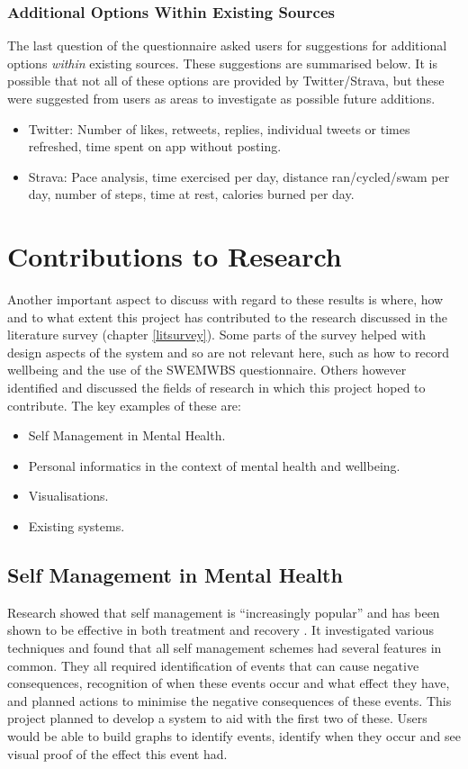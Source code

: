 \documentclass[11pt,openright,a4paper]{report}
\begin{document}
\subsubsection{Additional Options Within Existing Sources}
The last question of the questionnaire asked users for suggestions for additional options \emph{within} existing sources. These suggestions are summarised below. It is possible that not all of these options are provided by Twitter/Strava, but these were suggested from users as areas to investigate as possible future additions.
\begin{itemize}
\item Twitter: Number of likes, retweets, replies, individual tweets or times refreshed, time spent on app without posting.
\item Strava: Pace analysis, time exercised per day, distance ran/cycled/swam per day, number of steps, time at rest, calories burned per day.
\end{itemize}

\section{Contributions to Research} \label{sec:contr}
Another important aspect to discuss with regard to these results is where, how and to what extent this project has contributed to the research discussed in the literature survey (chapter \ref{litsurvey}). Some parts of the survey helped with design aspects of the system and so are not relevant here, such as how to record wellbeing and the use of the SWEMWBS questionnaire. Others however identified and discussed the fields of research in which this project hoped to contribute. The key examples of these are:
\begin{itemize}
\item Self Management in Mental Health.
\item Personal informatics in the context of mental health and wellbeing.
\item Visualisations.
\item Existing systems.
\end{itemize}

\subsection{Self Management in Mental Health}
Research showed that self management is \enquote{increasingly popular} \parencite{selfhelpanxiety} and has been shown to be effective in both treatment \parencite{wrapstudy} and recovery \parencite{selfmanagementrelapse}. It investigated various techniques and found that all self management schemes had several features in common. They all required identification of events that can cause negative consequences, recognition of when these events occur and what effect they have, and planned actions to minimise the negative consequences of these events. This project planned to develop a system to aid with the first two of these. Users would be able to build graphs to identify events, identify when they occur and see visual proof of the effect this event had.
\end{document}
